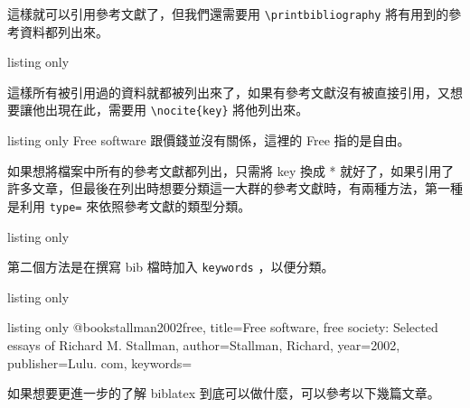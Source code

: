 這樣就可以引用參考文獻了，但我們還需要用 \verb`\printbibliography` 將有用到的參考資料都列出來。

\begin{tcblisting}{listing only}
\printbibliography
\end{tcblisting}

這樣所有被引用過的資料就都被列出來了，如果有參考文獻沒有被直接引用，又想要讓他出現在此，需要用 \verb`\nocite{key}` 將他列出來。

\begin{tcblisting}{listing only}
Free software 跟價錢並沒有關係，這裡的 Free 指的是自由。\cite{stallman2002free}
\nocite{key}
\printbibliography
\end{tcblisting}

如果想將檔案中所有的參考文獻都列出，只需將 key 換成 * 就好了，如果引用了許多文章，但最後在列出時想要分類這一大群的參考文獻時，有兩種方法，第一種是利用 \verb`type=` 來依照參考文獻的類型分類。

\begin{tcblisting}{listing only}
\printbibliography[type=article, title=article]
\printbibliography[type=book, title=book]
\end{tcblisting}

第二個方法是在撰寫 bib 檔時加入 \verb`keywords` ，以便分類。

\begin{tcblisting}{listing only}
\printbibliography[keyword=LaTeX, title=article]
\printbibliography[keyword=Overleaf, title=book]
\end{tcblisting}

\begin{tcblisting}{listing only}
@book{stallman2002free,
  title={Free software, free society: Selected essays of Richard M. Stallman},
  author={Stallman, Richard},
  year={2002},
  publisher={Lulu. com},
  keywords={}
}
\end{tcblisting}

如果想要更進一步的了解 biblatex 到底可以做什麼，可以參考以下幾篇文章。
